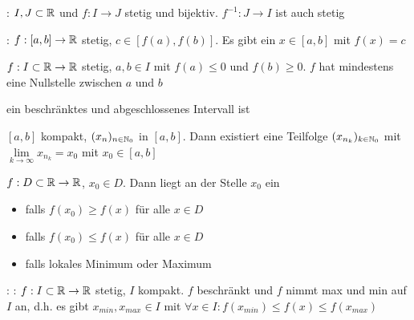 \Satz {}: $I, J \subset \mathbb{R}$ und $f: I \to J$ stetig und
bijektiv. $f^{-1}: J \to I$ ist auch stetig

\Satz {}: $f: [a, b] \to \mathbb{R}$ stetig, $c \in [f(a), f(b)]$.
Es gibt ein $x \in [a, b]$ mit $f(x) = c$

\Kor $f: I \subset \mathbb{R} \to \mathbb{R}$ stetig, $a, b \in I$ mit $f(a) \le 0$ und $f(b) \ge 0$.
$f$ hat mindestens eine Nullstelle zwischen $a$ und $b$

\Def ein beschränktes und abgeschlossenes Intervall ist 

\Satz $[a, b]$ kompakt, $(x_n)_{n\in\mathbb{N}_0}$ in $[a, b]$.
Dann existiert eine Teilfolge $(x_{n_k})_{k\in\mathbb{N}_0}$ mit $\lim\limits_{k\to\infty} x_{n_k} = x_0$ mit $x_0 \in [a, b]$

\Def $f: D \subset \mathbb{R} \to \mathbb{R}$, $x_0 \in D$. Dann liegt an der Stelle $x_0$ ein
\vspace{-0.6em}
\begin{itemize}
    \item {} falls $f(x_0) \ge f(x)$ für alle $x \in D$
    \item {} falls $f(x_0) \le f(x)$ für alle $x \in D$
    \item {} falls lokales Minimum oder Maximum
\end{itemize}

\Satz: : $f: I \subset \mathbb{R} \to \mathbb{R}$ stetig,
$I$ kompakt. $f$ beschränkt und $f$ nimmt max und min auf $I$ an,
d.h. es gibt $x_{min}, x_{max} \in I$ mit $\forall x \in I : f(x_{min}) \le f(x) \le f(x_{max})$
